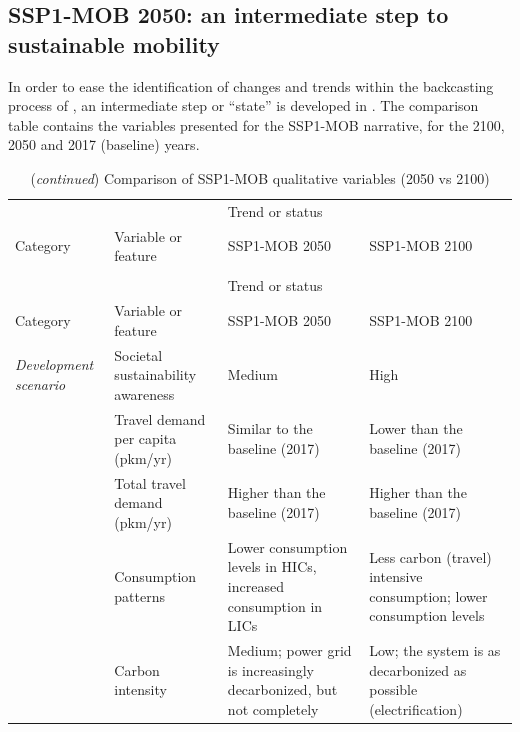 \subsection{SSP1-MOB 2050: an intermediate step to sustainable mobility}
\label{ss:results:backcasting-2050-intermediate-step}
In order to ease the identification of changes and trends within the backcasting process of , an intermediate step or ``state'' is developed in . The comparison table contains the variables presented for the SSP1-MOB narrative, for the 2100, 2050 and 2017 (baseline) years.
%
\begin{landscape}
{\scriptsize
\begin{longtable}{p{2.5cm}p{3.5cm}p{6cm}p{6cm}}
\caption[Comparison of SSP1-MOB qualitative variables (2050 vs 2100)]{Comparison of qualitative variables underlying to the 2050 and 2100 SSP1-MOB narratives.}\\
\toprule
& & \multicolumn{2}{l}{Trend or status}\\
\cmidrule(l){3-4} Category & Variable or feature & SSP1-MOB 2050 & SSP1-MOB 2100\\
\midrule
\endfirsthead
\caption*{(\emph{continued}) Comparison of SSP1-MOB qualitative variables (2050 vs 2100)}\\
\toprule
& & \multicolumn{2}{l}{Trend or status}\\
\cmidrule(l){3-4} Category & Variable or feature & SSP1-MOB 2050 & SSP1-MOB 2100\\
\midrule
\endhead
\bottomrule
\endfoot
\bottomrule
\endlastfoot
\label{t:ssp1-mob-2050-narrative-thesis}
\textit{Development scenario} & Societal sustainability awareness & Medium & High \\*
 & Travel demand per capita (pkm/yr) & Similar to the baseline (2017) & Lower than the baseline (2017) \\*
 & Total travel demand (pkm/yr) & Higher than the baseline (2017) & Higher than the baseline (2017) \\*
 & Consumption patterns & Lower consumption levels in HICs, increased consumption in LICs & Less carbon (travel) intensive consumption; lower consumption levels \\*
 & Carbon intensity & Medium; power grid is increasingly decarbonized, but not completely & Low; the system is as decarbonized as possible (electrification) \\*

\end{longtable}}
\end{landscape}
